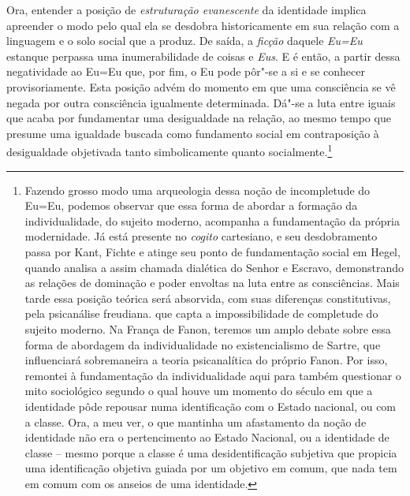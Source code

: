 Ora, entender a posição de \emph{estruturação evanescente} da identidade
implica apreender o modo pelo qual ela se desdobra historicamente em sua
relação com a linguagem e o solo social que a produz. De saída, a
\emph{ficção} daquele \emph{Eu=Eu} estanque perpassa uma inumerabilidade
de coisas e \emph{Eus}. E é então, a partir dessa negatividade ao Eu=Eu
que, por fim, o Eu pode pôr"-se a si e se conhecer provisoriamente. Esta
posição advém do momento em que uma consciência se vê negada por outra
consciência igualmente determinada. Dá"-se a luta entre iguais que acaba
por fundamentar uma desigualdade na relação, ao mesmo tempo que presume
uma igualdade buscada como fundamento social em contraposição à
desigualdade objetivada tanto simbolicamente quanto
socialmente.\footnote{Fazendo grosso modo uma arqueologia dessa noção de
  incompletude do Eu=Eu, podemos observar que essa forma de abordar a
  formação da individualidade, do sujeito moderno, acompanha a
  fundamentação da própria modernidade. Já está presente no
  \emph{cogito} cartesiano, e seu desdobramento passa por Kant, Fichte e
  atinge seu ponto de fundamentação social em Hegel, quando analisa a
  assim chamada dialética do Senhor e Escravo, demonstrando as relações
  de dominação e poder envoltas na luta entre as consciências. Mais
  tarde essa posição teórica será absorvida, com suas diferenças
  constitutivas, pela psicanálise freudiana. que capta a impossibilidade
  de completude do sujeito moderno. Na França de Fanon, teremos um amplo
  debate sobre essa forma de abordagem da individualidade no
  existencialismo de Sartre, que influenciará sobremaneira a teoria
  psicanalítica do próprio Fanon. Por isso, remontei à fundamentação da
  individualidade aqui para também questionar o mito sociológico segundo
  o qual houve um momento do século  em que a identidade pôde repousar
  numa identificação com o Estado nacional, ou com a classe. Ora, a meu
  ver, o que mantinha um afastamento da noção de identidade não era o
  pertencimento ao Estado Nacional, ou a identidade de classe -- mesmo
  porque a classe é uma desidentificação subjetiva que propicia uma
  identificação objetiva guiada por um objetivo em comum, que nada tem
  em comum com os anseios de uma identidade.}

